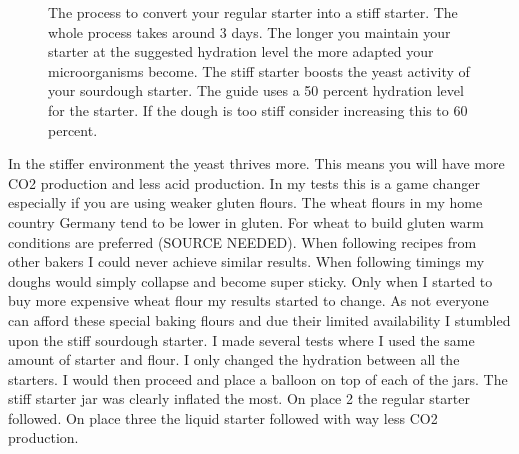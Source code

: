 \begin{figure}[!htb]
  \caption{The process to convert your regular starter into a stiff starter. The whole
  process takes around 3 days. The longer you maintain your starter at the
  suggested hydration level the more adapted your microorganisms become. The
  stiff starter boosts the yeast activity of your sourdough starter.
  The guide uses a 50 percent hydration level for the starter. If the dough is too stiff
  consider increasing this to 60 percent.}
  \label{fig:stiff-starter-conversion}
\end{figure}

In the stiffer environment the yeast thrives more. This means you will have
more CO2 production and less acid production. In my tests this is a game
changer especially if you are using weaker gluten flours. The wheat flours in
my home country Germany tend to be lower in gluten. For wheat to build gluten warm conditions
are preferred (SOURCE NEEDED). When following recipes from other bakers I
could never achieve similar results. When following timings my doughs would
simply collapse and become super sticky. Only when I started to buy more
expensive wheat flour my results started to change. As not everyone can afford
these special baking flours and due their limited availability I stumbled upon the
stiff sourdough starter. I made several tests where I used the same amount of
starter and flour. I only changed the hydration between all the starters. I
would then proceed and place a balloon on top of each of the jars. The stiff
starter jar was clearly inflated the most. On place 2 the regular starter
followed. On place three the liquid starter followed with way less CO2
production.

